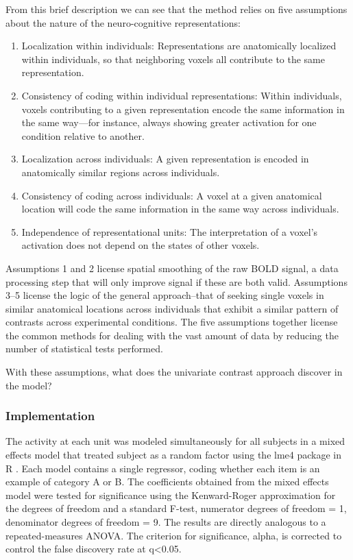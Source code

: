 From this brief description we can see that the method relies on five assumptions about the nature of the neuro-cognitive representations:

\begin{enumerate}
\item Localization within individuals: Representations are anatomically localized within individuals, so that neighboring voxels all contribute to the same representation.

\item Consistency of coding within individual representations: Within individuals, voxels contributing to a given representation encode the same information in the same way---for instance, always showing greater activation for one condition relative to another.

\item Localization across individuals: A given representation is encoded in anatomically similar regions across individuals.

\item Consistency of coding across individuals: A voxel at a given anatomical location will code the same information in the same way across individuals.

\item Independence of representational units: The interpretation of a voxel's activation does not depend on the states of other voxels.
\end{enumerate}


Assumptions 1 and 2 license spatial smoothing of the raw BOLD signal, a data processing step that will only improve signal if these are both valid. Assumptions 3--5 license the logic of the general approach--that of seeking single voxels in similar anatomical locations across individuals that exhibit a similar pattern of contrasts across experimental conditions. The five assumptions together license the common methods for dealing with the vast amount of data by reducing the number of statistical tests performed. 

With these assumptions, what does the univariate contrast approach discover in the model?

\subsubsection{Implementation}
The activity at each unit was modeled simultaneously for all subjects in a mixed effects model that treated subject as a random factor \cite{chen_linear_2013, friston_mixed-effects_2005} using the lme4 package in R \cite{bates_linear_2013}. Each model contains a single regressor, coding whether each item is an example of category A or B. The coefficients obtained from the mixed effects model were tested for significance using the Kenward-Roger approximation for the degrees of freedom \cite{kenward_small_1997} and a standard F-test, numerator degrees of freedom = 1, denominator degrees of freedom = 9. The results are directly analogous to a repeated-measures ANOVA. The criterion for significance, alpha, is corrected to control the false discovery rate at q<0.05. 

